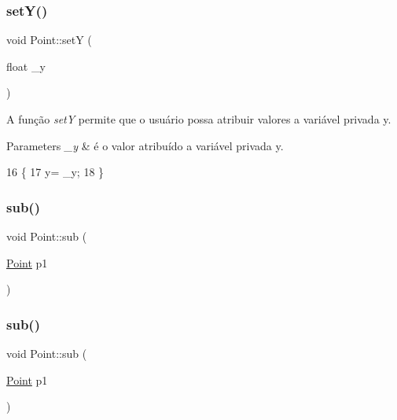 \mbox{\label{class_point_a9868c4601b0ea0c2d0de20fe41ee0e49}} 
\subsubsection{\texorpdfstring{set\+Y()}{setY()}\hspace{0.1cm}{\footnotesize\ttfamily [2/2]}}
{\footnotesize\ttfamily void Point\+::setY (\begin{DoxyParamCaption}\item[{float}]{\+\_\+y }\end{DoxyParamCaption})}



A função {\itshape setY} permite que o usuário possa atribuir valores a variável privada y. 


\begin{DoxyParams}{Parameters}
{\em \+\_\+y} & é o valor atribuído a variável privada y. \\
\hline
\end{DoxyParams}

\begin{DoxyCode}
16                         \{
17     y= \_y;
18 \}
\end{DoxyCode}
\mbox{\label{class_point_af7d9e533f0030edf4ab28fdc0f12acd4}} 
\subsubsection{\texorpdfstring{sub()}{sub()}\hspace{0.1cm}{\footnotesize\ttfamily [1/2]}}
{\footnotesize\ttfamily void Point\+::sub (\begin{DoxyParamCaption}\item[{\hyperlink{class_point}{Point}}]{p1 }\end{DoxyParamCaption})}

\mbox{\label{class_point_af7d9e533f0030edf4ab28fdc0f12acd4}} 
\subsubsection{\texorpdfstring{sub()}{sub()}\hspace{0.1cm}{\footnotesize\ttfamily [2/2]}}
{\footnotesize\ttfamily void Point\+::sub (\begin{DoxyParamCaption}\item[{\hyperlink{class_point}{Point}}]{p1 }\end{DoxyParamCaption})}



